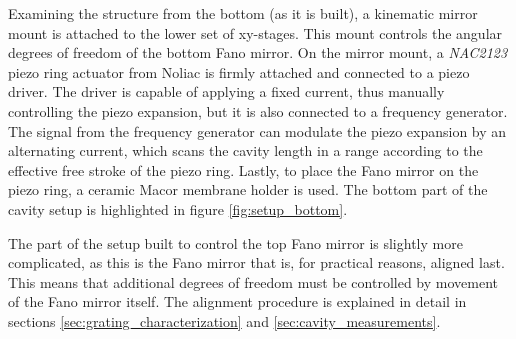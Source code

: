 Examining the structure from the bottom (as it is built), a kinematic mirror mount is attached to the lower set of xy-stages. This mount controls the angular degrees of freedom of the bottom Fano mirror. On the mirror mount, a \emph{NAC2123} piezo ring actuator from Noliac\cite{piezo_actuator} is firmly attached and connected to a piezo driver. The driver is capable of applying a fixed current, thus manually controlling the piezo expansion, but it is also connected to a frequency generator. The signal from the frequency generator can modulate the piezo expansion by an alternating current, which scans the cavity length in a range according to the effective free stroke of the piezo ring. Lastly, to place the Fano mirror on the piezo ring, a ceramic Macor membrane holder is used. The bottom part of the cavity setup is highlighted in figure \ref{fig:setup_bottom}.

The part of the setup built to control the top Fano mirror is slightly more complicated, as this is the Fano mirror that is, for practical reasons, aligned last. This means that additional degrees of freedom must be controlled by movement of the Fano mirror itself. The alignment procedure is explained in detail in sections \ref{sec:grating_characterization} and \ref{sec:cavity_measurements}.

